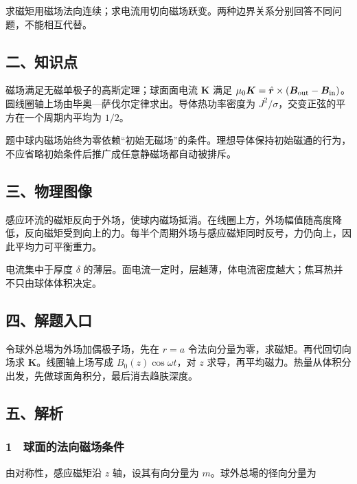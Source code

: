 \documentclass[12pt,a4paper,fontset=fandol]{ctexart}
\begin{document}
求磁矩用磁场法向连续；求电流用切向磁场跃变。两种边界关系分别回答不同问题，不能相互代替。

\subsection{二、知识点}\label{ux4e8cux77e5ux8bc6ux70b9-5}

磁场满足无磁单极子的高斯定理；球面面电流 \(\boldsymbol K\) 满足
\(\mu_0\boldsymbol K=\hat{\boldsymbol r}\times(\boldsymbol B_{\rm out}-\boldsymbol B_{\rm in})\)。圆线圈轴上场由毕奥---萨伐尔定律求出。导体热功率密度为
\(J^2/\sigma\)，交变正弦的平方在一个周期内平均为 \(1/2\)。

题中球内磁场始终为零依赖``初始无磁场''的条件。理想导体保持初始磁通的行为，不应省略初始条件后推广成任意静磁场都自动被排斥。

\subsection{三、物理图像}\label{ux4e09ux7269ux7406ux56feux50cf-5}

感应环流的磁矩反向于外场，使球内磁场抵消。在线圈上方，外场幅值随高度降低，反向磁矩受到向上的力。每半个周期外场与感应磁矩同时反号，力仍向上，因此平均力可平衡重力。

电流集中于厚度 \(\delta\)
的薄层。面电流一定时，层越薄，体电流密度越大；焦耳热并不只由球体体积决定。

\subsection{四、解题入口}\label{ux56dbux89e3ux9898ux5165ux53e3-5}

令球外总場为外场加偶极子场，先在 \(r=a\)
令法向分量为零，求磁矩。再代回切向场求 \(\boldsymbol K\)。线圈轴上场写成
\(B_0(z)\cos\omega t\)，对 \(z\)
求导，再平均磁力。热量从体积分出发，先做球面角积分，最后消去趋肤深度。

\subsection{五、解析}\label{ux4e94ux89e3ux6790-5}

\subsubsection{1　球面的法向磁场条件}\label{ux7403ux9762ux7684ux6cd5ux5411ux78c1ux573aux6761ux4ef6}

由对称性，感应磁矩沿 \(z\) 轴，设其有向分量为
\(m\)。球外总場的径向分量为
\end{document}

